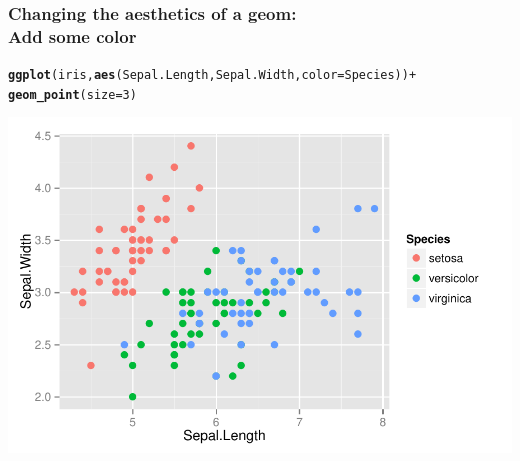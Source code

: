 \documentclass{beamer}\usepackage[]{graphicx}\usepackage[]{color}
\makeatletter
\newcommand{\hlnum}[1]{\textcolor[rgb]{0.686,0.059,0.569}{#1}}%
\newcommand{\hlopt}[1]{\textcolor[rgb]{0,0,0}{#1}}%
\newcommand{\hlstd}[1]{\textcolor[rgb]{0.345,0.345,0.345}{#1}}%
\newcommand{\hlkwc}[1]{\textcolor[rgb]{0.333,0.667,0.333}{#1}}%
\newcommand{\hlkwd}[1]{\textcolor[rgb]{0.737,0.353,0.396}{\textbf{#1}}}%
\newenvironment{kframe}{%
 \def\at@end@of@kframe{}%
 \ifinner\ifhmode%
  \def\at@end@of@kframe{\end{minipage}}%
  \begin{minipage}{\columnwidth}%
 \fi\fi%
 \def\FrameCommand##1{\hskip\@totalleftmargin \hskip-\fboxsep
 \colorbox{shadecolor}{##1}\hskip-\fboxsep
     \hskip-\linewidth \hskip-\@totalleftmargin \hskip\columnwidth}%
 \MakeFramed {\advance\hsize-\width
   \@totalleftmargin\z@ \linewidth\hsize
   \@setminipage}}%
 {\par\unskip\endMakeFramed%
 \at@end@of@kframe}
\newenvironment{knitrout}{}{} %
\makeatother
\begin{document}
\begin{frame}[fragile]
\frametitle{Changing the aesthetics of a geom: \\Add some color}
\begin{knitrout}\footnotesize
{}\color{fgcolor}\begin{kframe}
\begin{alltt}
\hlkwd{ggplot}\hlstd{(iris,} \hlkwd{aes}\hlstd{(Sepal.Length, Sepal.Width,} \hlkwc{color} \hlstd{= Species))} \hlopt{+}
\hlkwd{geom_point}\hlstd{(}\hlkwc{size} \hlstd{=} \hlnum{3}\hlstd{)}
\end{alltt}
\end{kframe}

{\centering \includegraphics[width=.75\linewidth]{figure/first_plot_color_} 

}



\end{knitrout}
\end{frame}

\end{document}
